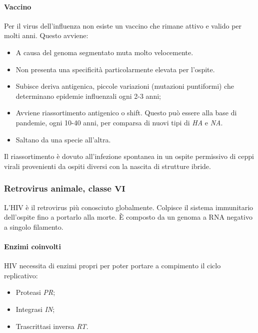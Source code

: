 			\paragraph{Vaccino}
			Per il virus dell'influenza non esiste un vaccino che rimane attivo e valido per molti anni. 
			Questo avviene:
			\begin{multicols}{2}
				\begin{itemize}
    					\item A causa del genoma segmentato muta molto velocemente.
    					\item Non presenta una specificit\`a particolarmente elevata per l'ospite.
    					\item Subisce deriva antigenica, piccole variazioni (mutazioni puntiformi) che determinano epidemie influenzali ogni 2-3 anni; 
    					\item Avviene riassortimento antigenico o shift. 
						Questo pu\`o essere alla base di pandemie, ogni 10-40 anni, per comparsa di nuovi tipi di \emph{HA} e \emph{NA}. 
					\item Saltano da una specie all'altra.
				\end{itemize}
			\end{multicols}
			Il riassortimento \`e dovuto all'infezione spontanea in un ospite permissivo di ceppi virali provenienti da ospiti diversi con la nascita di strutture ibride.

			
		\subsubsection{Retrovirus animale, classe $\mathbf{VI}$}
		L'HIV \`e il retrovirus pi\`u conosciuto globalmente. 
		Colpisce il sistema immunitario dell'ospite fino a portarlo alla morte. 
		\`E composto da un genoma a RNA negativo a singolo filamento. 

			\paragraph{Enzimi coinvolti}
			HIV necessita di enzimi propri per poter portare a compimento il ciclo replicativo:
			\begin{multicols}{2}
				\begin{itemize}
					\item Proteasi \emph{PR}; 
					\item Integrasi \emph{IN}; 
					\item Trascrittasi inversa \emph{RT}.
				\end{itemize}
			\end{multicols}

